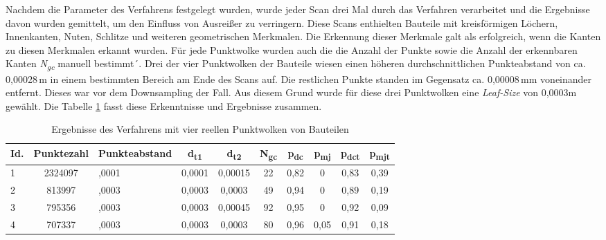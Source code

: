 Nachdem die Parameter des Verfahrens festgelegt wurden, wurde jeder Scan drei Mal durch das Verfahren verarbeitet und die Ergebnisse davon wurden gemittelt, um den Einfluss von Ausreißer zu verringern. Diese Scans enthielten Bauteile mit kreisförmigen Löchern, Innenkanten, Nuten, Schlitze und weiteren geometrischen Merkmalen. Die Erkennung dieser Merkmale galt als erfolgreich, wenn die Kanten zu diesen Merkmalen erkannt wurden. Für jede Punktwolke wurden auch die die Anzahl der Punkte sowie die Anzahl der erkennbaren Kanten \textit{N\textsubscript{gc}} manuell bestimmt´. Drei der vier Punktwolken der Bauteile wiesen einen höheren durchschnittlichen Punkteabstand von ca. 0,00028\,\si{\m} in einem bestimmten Bereich am Ende des Scans auf. Die restlichen Punkte standen im Gegensatz ca. 0,00008\,\si{\m}m voneinander entfernt. Dieses war vor dem Downsampling der Fall. Aus diesem Grund wurde für diese drei Punktwolken eine \textit{Leaf-Size} von 0,0003m gewählt. Die Tabelle \ref{table: test_3-2_results} fasst diese Erkenntnisse und Ergebnisse zusammen. 

\begin{table}[t]
	\centering
	\begin{tabularx}{\textwidth}{l c >{\centering}X *{7}{c}}
		\hline
		\textbf{Id.} & \textbf{Punktezahl} & \textbf{Punkteabstand} & \textbf{d\textsubscript{t1}} & \textbf{d\textsubscript{t2}} & \textbf{N\textsubscript{gc}} & \textbf{p\textsubscript{dc}} & \textbf{p\textsubscript{mj}} & \textbf{p\textsubscript{dct}} & \textbf{p\textsubscript{mjt}}\\
		\hline
		1 & 2324097 & 0,0001 & 0,0001 & 0,00015 & 22 & 0,82 & 0 & 0,83 & 0,39 \\
		2 & 813997 & 0,0003 & 0,0003 & 0,0003 & 49 & 0,94 & 0 & 0,89 & 0,19 \\
		3 & 795356 & 0,0003 & 0,0003 & 0,00045 & 92 & 0,95 & 0 & 0,92 & 0,09 \\
		4 & 707337 & 0,0003 & 0,0003 & 0,0003 & 80 & 0,96 & 0,05 & 0,91 & 0,18 \\
		\hline
	\end{tabularx}
	\caption{Ergebnisse des Verfahrens mit vier reellen Punktwolken von Bauteilen}
	\label{table: test_3-2_results}
\end{table}

